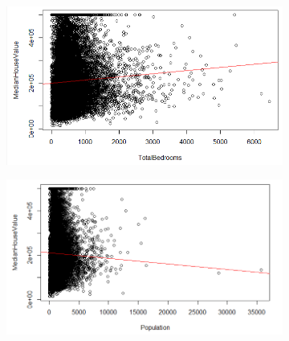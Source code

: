 \begin{figure}[!tbh]
	\begin{subfigure}{0.5\textwidth}
	\includegraphics[width=1\linewidth]{figures/regre_5}
\caption{}
\label{fig:regre5}
	\end{subfigure}\hfil %
	\begin{subfigure}{0.5\textwidth}
	\includegraphics[width=1\linewidth]{figures/regre_6}
\caption{}
\label{fig:regre6}
	\end{subfigure}\hfil %

	\medskip


\end{figure}
